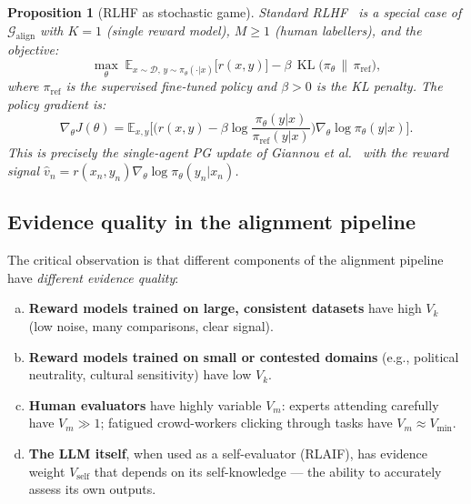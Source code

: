\documentclass[11pt,a4paper]{article}
\newtheorem{proposition}[theorem]{Proposition}
\DeclareMathOperator{\KL}{KL}
\newcommand{\E}{\mathbb{E}}
\newcommand{\cD}{\mathcal{D}}
\begin{document}
\begin{proposition}[RLHF as stochastic game]
\label{prop:rlhf-game}
Standard RLHF~\cite{christiano2017, ouyang2022} is a special case of $\mathcal{G}_{\mathrm{align}}$ with $K = 1$ (single reward model), $M \geq 1$ (human labellers), and the objective:
\begin{equation}
\label{eq:rlhf-obj}
    \max_\theta \; \E_{x \sim \cD, \, y \sim \pi_\theta(\cdot|x)}\bigl[r(x, y)\bigr] - \beta \, \KL\bigl(\pi_\theta \,\|\, \pi_{\mathrm{ref}}\bigr),
\end{equation}
where $\pi_{\mathrm{ref}}$ is the supervised fine-tuned policy and $\beta > 0$ is the KL penalty. The policy gradient is:
\begin{equation}
\label{eq:rlhf-pg}
    \nabla_\theta J(\theta) = \E_{x, y}\bigl[\bigl(r(x,y) - \beta \log \frac{\pi_\theta(y|x)}{\pi_{\mathrm{ref}}(y|x)}\bigr) \nabla_\theta \log \pi_\theta(y|x)\bigr].
\end{equation}
This is precisely the single-agent PG update of Giannou et al.~\cite{giannou2022} with the reward signal $\hat{v}_n = r(x_n, y_n) \nabla_\theta \log \pi_\theta(y_n | x_n)$.
\end{proposition}

\subsection{Evidence quality in the alignment pipeline}

The critical observation is that different components of the alignment pipeline have \emph{different evidence quality}:

\begin{enumerate}[(a)]
    \item \textbf{Reward models trained on large, consistent datasets} have high $V_k$ (low noise, many comparisons, clear signal).
    \item \textbf{Reward models trained on small or contested domains} (e.g., political neutrality, cultural sensitivity) have low $V_k$.
    \item \textbf{Human evaluators} have highly variable $V_m$: experts attending carefully have $V_m \gg 1$; fatigued crowd-workers clicking through tasks have $V_m \approx V_{\min}$.
    \item \textbf{The LLM itself}, when used as a self-evaluator (RLAIF), has evidence weight $V_{\mathrm{self}}$ that depends on its self-knowledge --- the ability to accurately assess its own outputs.
\end{enumerate}
\end{document}
